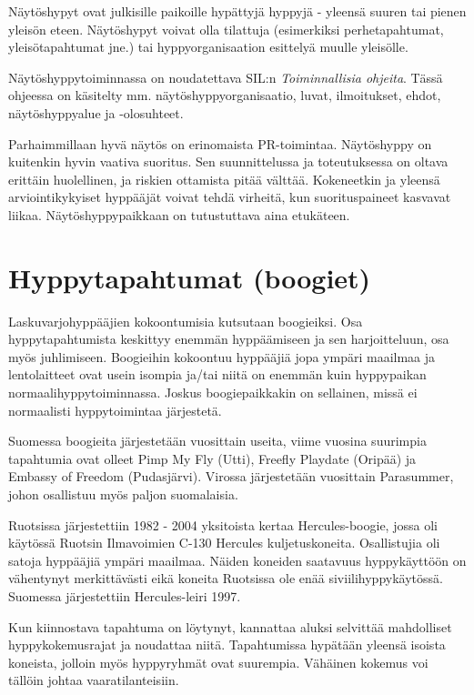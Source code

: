 Näytöshypyt ovat julkisille paikoille hypättyjä hyppyjä - yleensä suuren tai pienen yleisön eteen. Näytöshypyt voivat olla tilattuja (esimerkiksi perhetapahtumat, yleisötapahtumat jne.) tai hyppyorganisaation esittelyä muulle yleisölle. 


Näytöshyppytoiminnassa on noudatettava SIL:n \textit{Toiminnallisia ohjeita}. Tässä ohjeessa on käsitelty mm. näytöshyppyorganisaatio, luvat, ilmoitukset, ehdot, näytöshyppyalue ja -olosuhteet.  


Parhaimmillaan hyvä näytös on erinomaista PR-toimintaa. Näytöshyppy on kuitenkin hyvin vaativa suoritus. Sen suunnittelussa ja toteutuksessa on oltava erittäin huolellinen, ja riskien ottamista pitää välttää. Kokeneetkin ja yleensä arviointikykyiset hyppääjät voivat tehdä virheitä, kun suorituspaineet kasvavat liikaa. Näytöshyppypaikkaan on tutustuttava aina etukäteen. 

\section{ Hyppytapahtumat (boogiet) }
\label{erikoishypyt-hyppytapahtumat-boogiet}


Laskuvarjohyppääjien kokoontumisia kutsutaan boogieiksi. Osa hyppytapahtumista keskittyy enemmän hyppäämiseen ja sen harjoitteluun, osa myös juhlimiseen. Boogieihin kokoontuu hyppääjiä jopa ympäri maailmaa ja lentolaitteet ovat usein isompia ja/tai niitä on enemmän kuin hyppypaikan normaalihyppytoiminnassa. Joskus boogiepaikkakin on sellainen, missä ei normaalisti hyppytoimintaa järjestetä. 


Suomessa boogieita järjestetään vuosittain useita, viime vuosina suurimpia tapahtumia ovat olleet Pimp My Fly (Utti), Freefly Playdate (Oripää) ja Embassy of Freedom (Pudasjärvi). Virossa järjestetään vuosittain Parasummer, johon osallistuu myös paljon suomalaisia. 


Ruotsissa järjestettiin 1982 - 2004 yksitoista kertaa Hercules-boogie, jossa oli käytössä Ruotsin Ilmavoimien C-130 Hercules kuljetuskoneita. Osallistujia oli satoja hyppääjiä ympäri maailmaa. Näiden koneiden saatavuus hyppykäyttöön on vähentynyt merkittävästi eikä koneita Ruotsissa ole enää siviilihyppykäytössä. Suomessa järjestettiin Hercules-leiri 1997. 


Kun kiinnostava tapahtuma on löytynyt, kannattaa aluksi selvittää mahdolliset hyppykokemusrajat ja noudattaa niitä. Tapahtumissa hypätään yleensä isoista koneista, jolloin myös hyppyryhmät ovat suurempia. Vähäinen kokemus voi tällöin johtaa vaaratilanteisiin.  


